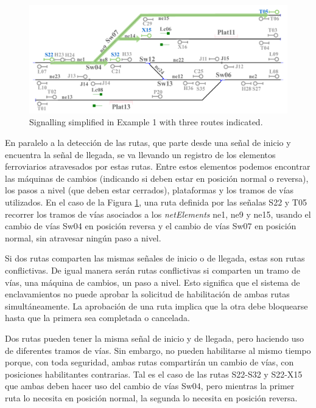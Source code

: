     \begin{figure}[H]
    	\centering
    	\includegraphics[width=1\textwidth]{Figuras/Figure11.pdf}
    	\centering\caption{Signalling simplified in Example 1 with three routes indicated.}
    	\label{fig:Routes}
    \end{figure}
        
    En paralelo a la detección de las rutas, que parte desde una señal de inicio y encuentra la señal de llegada, se va llevando un registro de los elementos ferroviarios atravesados por estas rutas. Entre estos elementos podemos encontrar las máquinas de cambios (indicando si deben estar en posición normal o reversa), los pasos a nivel (que deben estar cerrados), plataformas y los tramos de vías utilizados. En el caso de la Figura \ref{fig:Routes}, una ruta definida por las señalas S22 y T05 recorrer los tramos de vías asociados a los \textit{netElements} ne1, ne9 y ne15, usando el cambio de vías Sw04 en posición reversa y el cambio de vías Sw07 en posición normal, sin atravesar ningún paso a nivel.
    
    Si dos rutas comparten las mismas señales de inicio o de llegada, estas son rutas conflictivas. De igual manera serán rutas conflictivas si comparten un tramo de vías, una máquina de cambios, un paso a nivel. Esto significa que el sistema de enclavamientos no puede aprobar la solicitud de habilitación de ambas rutas simultáneamente. La aprobación de una ruta implica que la otra debe bloquearse hasta que la primera sea completada o cancelada. 
    
    Dos rutas pueden tener la misma señal de inicio y de llegada, pero haciendo uso de diferentes tramos de vías. Sin embargo, no pueden habilitarse al mismo tiempo porque, con toda seguridad, ambas rutas compartirán un cambio de vías, con posiciones habilitantes contrarias. Tal es el caso de las rutas S22-S32 y S22-X15 que ambas deben hacer uso del cambio de vías Sw04, pero mientras la primer ruta lo necesita en posición normal, la segunda lo necesita en posición reversa.
    
